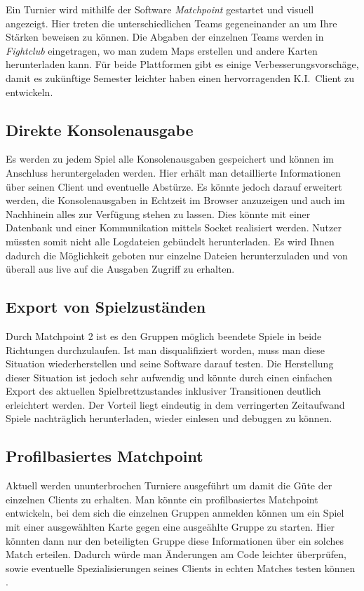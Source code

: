 Ein Turnier wird mithilfe der Software \emph{Matchpoint} gestartet und visuell angezeigt.
Hier treten die unterschiedlichen Teams gegeneinander an um Ihre St\"arken beweisen zu k\"onnen.
Die Abgaben der einzelnen Teams werden in \emph{Fightclub} eingetragen, wo man zudem Maps erstellen und andere Karten herunterladen kann.
F\"ur beide Plattformen gibt es einige Verbesserungsvorsch\"age, damit es zuk\"unftige Semester leichter haben einen hervorragenden K.I.\ Client zu entwickeln.

\subsection{Direkte Konsolenausgabe}\label{subsec:direkte-konsolenausgabe}
Es werden zu jedem Spiel alle Konsolenausgaben gespeichert und k\"onnen im Anschluss heruntergeladen werden.
Hier erh\"alt man detaillierte Informationen \"uber seinen Client und eventuelle Abst\"urze.
Es k\"onnte jedoch darauf erweitert werden, die Konsolenausgaben in Echtzeit im Browser anzuzeigen und auch im Nachhinein alles zur Verf\"ugung stehen zu lassen.
Dies k\"onnte mit einer Datenbank und einer Kommunikation mittels Socket realisiert werden.
Nutzer m\"ussten somit nicht alle Logdateien geb\"undelt herunterladen.
Es wird Ihnen dadurch die M\"oglichkeit geboten nur einzelne Dateien herunterzuladen und von \"uberall aus live auf die Ausgaben Zugriff zu erhalten.

\subsection{Export von Spielzust\"anden}\label{subsec:export-von-spielzustaenden}
Durch Matchpoint 2 ist es den Gruppen m\"oglich beendete Spiele in beide Richtungen durchzulaufen.
Ist man disqualifiziert worden, muss man diese Situation wiederherstellen und seine Software darauf testen.
Die Herstellung dieser Situation ist jedoch sehr aufwendig und k\"onnte durch einen einfachen Export des aktuellen Spielbrettzustandes inklusiver Transitionen deutlich erleichtert werden.
Der Vorteil liegt eindeutig in dem verringerten Zeitaufwand Spiele nachtr\"aglich herunterladen, wieder einlesen und debuggen zu k\"onnen.

\subsection{Profilbasiertes Matchpoint}\label{subsec:profilbasiertes-matchpoint}
Aktuell werden ununterbrochen Turniere ausgef\"uhrt um damit die G\"ute der einzelnen Clients zu erhalten.
Man k\"onnte ein profilbasiertes Matchpoint entwickeln, bei dem sich die einzelnen Gruppen anmelden k\"onnen um ein Spiel mit einer ausgew\"ahlten Karte gegen eine ausge\"ahlte Gruppe zu starten.
Hier k\"onnten dann nur den beteiligten Gruppe diese Informationen \"uber ein solches Match erteilen.
Dadurch w\"urde man \"Anderungen am Code leichter \"uberpr\"ufen, sowie eventuelle Spezialisierungen seines Clients in echten Matches testen k\"onnen .

